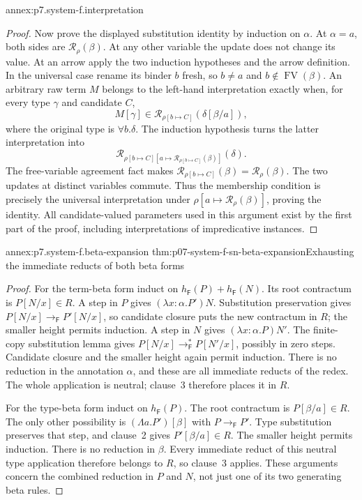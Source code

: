 \begin{annexitem}{annex:p7.system-f.interpretation}
\begin{proof}
Now prove the displayed substitution identity by induction on
\(\alpha\). At \(\alpha=a\), both sides are
\(\mathcal R_\rho(\beta)\). At any other variable the update does
not change its value. At an arrow apply the two induction hypotheses and
the arrow definition. In the universal case rename its binder \(b\)
fresh, so \(b\ne a\) and \(b\notin\operatorname{FV}(\beta)\).
An arbitrary raw term \(M\) belongs to the left-hand interpretation
exactly when, for every type \(\gamma\) and candidate \(C\),
\[
 M[\gamma]\in
 \mathcal R_{\rho[b\mapsto C]}(\delta[\beta/a]),
\]
where the original type is \(\forall b.\delta\). The induction
hypothesis turns the latter interpretation into
\[
 \mathcal R_{\rho[b\mapsto C]
     [a\mapsto\mathcal R_{\rho[b\mapsto C]}(\beta)]}(\delta).
\]
The free-variable agreement fact makes
\(\mathcal R_{\rho[b\mapsto C]}(\beta)=\mathcal R_\rho(\beta)\).
The two updates at distinct variables commute. Thus the membership
condition is precisely the universal interpretation under
\(\rho[a\mapsto\mathcal R_\rho(\beta)]\), proving the identity.
All candidate-valued parameters used in this argument exist by the first
part of the proof, including interpretations of impredicative instances.
\end{proof}
\end{annexitem}

\begin{annexitem}{annex:p7.system-f.beta-expansion}
 {thm:p07-system-f-sn-beta-expansion}{Exhausting the immediate reducts of both beta forms}
\begin{proof}
For the term-beta form induct on
\(h_{\mathsf F}(P)+h_{\mathsf F}(N)\). Its root contractum is
\(P[N/x]\in R\). A step in \(P\) gives
\((\lambda x{:}\alpha.P')N\). Substitution preservation gives
\(P[N/x]\to_{\mathsf F}P'[N/x]\), so candidate closure puts the
new contractum in \(R\); the smaller height permits induction.
A step in \(N\) gives \((\lambda x{:}\alpha.P)N'\).
The finite-copy substitution lemma gives
\(P[N/x]\to_{\mathsf F}^*P[N'/x]\), possibly in zero steps.
Candidate closure and the smaller height again permit induction.
There is no reduction in the annotation \(\alpha\), and these are
all immediate reducts of the redex. The whole application is neutral;
clause~3 therefore places it in \(R\).

For the type-beta form induct on \(h_{\mathsf F}(P)\). The root
contractum is \(P[\beta/a]\in R\). The only other possibility is
\((\Lambda a.P')[\beta]\) with \(P\to_{\mathsf F}P'\).
Type substitution preserves that step, and clause~2 gives
\(P'[\beta/a]\in R\). The smaller height permits induction.
There is no reduction in \(\beta\). Every immediate reduct of this
neutral type application therefore belongs to \(R\), so clause~3
applies. These arguments concern the combined reduction in \(P\) and
\(N\), not just one of its two generating beta rules.
\end{proof}
\end{annexitem}

